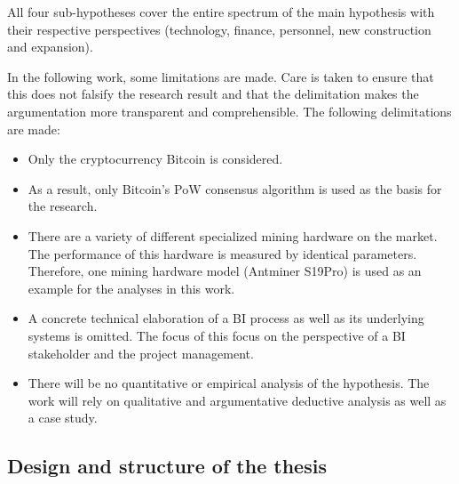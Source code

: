 All four sub-hypotheses cover the entire spectrum of the main hypothesis with their respective perspectives (technology, finance, personnel, new construction and expansion).

In the following work, some limitations are made. Care is taken to ensure that this does not falsify the research result 
and that the delimitation makes the argumentation more transparent and comprehensible. The following delimitations are made: 

\begin{itemize} 
    \item Only the cryptocurrency Bitcoin is considered. 
    \item As a result, only Bitcoin's \ac{PoW} consensus algorithm is used as the basis for the research. 
    \item There are a variety of different specialized mining hardware on the market. The performance of this hardware is measured by identical 
    parameters. Therefore, one mining hardware model (Antminer S19Pro) is used as an example for the analyses in this work. 
    \item A concrete technical elaboration of a \ac{BI} process as well as its underlying systems is omitted. The focus of this
    focus on the perspective of a \ac{BI} stakeholder and the project management. 
    \item There will be no quantitative or empirical analysis of the hypothesis. The work will rely on qualitative and argumentative 
    deductive analysis as well as a case study.
\end{itemize}

\subsection{Design and structure of the thesis} \label{toc:aufbauundstruktur}

